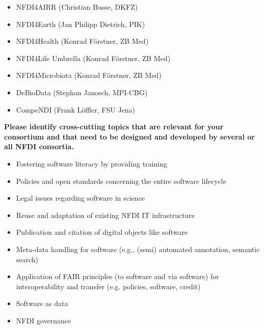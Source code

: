 \documentclass[11pt,a4paper]{scrlttr2}
\begin{document}
\begin{letter}{}
\begin{itemize}
\begin{itemize}
 \setlength\itemsep{0em}
 \item NFDI4AIRR (Christian Busse, DKFZ)
 \item NFDI4Earth (Jan Philipp Dietrich, PIK)
 \item NFDI4Health (Konrad Förstner, ZB Med)
 \item NFDI4Life Umbrella (Konrad Förstner, ZB Med)
 \item NFDI4Microbiota (Konrad Förstner, ZB Med)
 \item DeBioData (Stephan Janosch, MPI-CBG)
 \item CompeNDI (Frank Löffler, FSU Jena)
\end{itemize}
\end{itemize}


\textbf{Please identify cross-cutting topics that are relevant for your consortium and that
need to be designed and developed by several or all NFDI consortia.}\\
\begin{itemize}
 \setlength\itemsep{0em}
\item Fostering software literacy by providing training
\item Policies and open standards concerning the entire software lifecycle
\item Legal issues regarding software in science
\item Reuse and adaptation of existing NFDI IT infrastructure
\item Publication and citation of digital objects like software
\item Meta-data handling for software (e.g., (semi) automated annotation, semantic search)
\item Application of FAIR principles (to software and via software) for interoperability and transfer (e.g. policies, software, credit)
\item Software as data 
\item NFDI governance
\end{itemize}


\end{letter}
\end{document}
